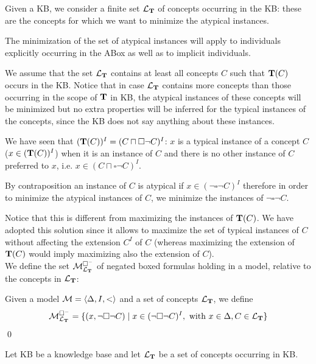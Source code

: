 \documentclass[a4paper, 11pt, oneside]{duthesis}
\newcommand{\tip}{{\bf T}}
\newcommand{\nott} {\lnot}
\newcommand{\tc} {\mid}
\newcommand{\bbox}{\square}
\newcommand{\sx} {\langle}
\newcommand{\dx} {\rangle}
\newcommand{\ellet} {\mathcal{L}_{\bf T}}
\newcommand{\emme} {\begin{mathcal}M\end{mathcal}}
\newenvironment{definition}
{\begin{defi} \rm}{\qed \end{defi}}
\newenvironment{definition}
{\begin{defi} \rm}{\qed \end{defi}}
\newtheorem{definition}{Definition}
\newcounter{posu}
\newtheorem{definition}[posu]{Definition}
\begin{document}
Given a KB, we consider a finite set $\ellet$ of concepts occurring in the KB: these are the concepts for which we want to minimize the atypical instances.

The minimization of the set of atypical instances will apply to individuals explicitly occurring in the ABox as well as to implicit individuals.

We assume that the set $\ellet$ contains at least all concepts $C$ such that $\tip(C)$ occurs in the KB.
Notice that in case $\ellet$ contains more concepts than those occurring in the scope of $\tip$ in KB, the atypical instances of these concepts will be minimized but no extra properties will be inferred for the typical instances of the concepts, since the KB does not say anything about these instances.

We have seen that $(\tip(C))^I =(C \sqcap \bbox \neg C)^I$: $x$ is a typical instance  of a concept $C$ ($x \in (\tip(C))^I$) when it is an instance of $C$  and there is no other instance of $C$ preferred to $x$, i.e. $x \in (C \sqcap \bbox \neg C)^I$.

By contraposition an instance of $C$ is atypical if $x \in (\neg \bbox \neg C)^I$ therefore in order to minimize the atypical instances of $C$, we minimize the instances of $\neg \bbox \neg C$.

Notice that this is different from maximizing the instances of $\tip(C)$.
We have adopted this solution since it allows to maximize the set of typical instances of $C$ without affecting the extension $C^I$ of $C$ (whereas maximizing the extension of $\tip(C)$  would imply maximizing also the extension of $C$).\\

We define the set $\emme^{\bbox^-}_{\ellet}$ of negated boxed formulas holding in a model, relative to the concepts in $\ellet$:

\begin{definition}
Given a model $\emme=\sx \Delta, I, <\dx$ and a set of concepts $\ellet$, we define $$\emme^{\bbox^-}_{\ellet}=\{(x, \nott \bbox \nott C) \tc x \in (\nott \bbox \nott C)^I, \ \mbox{with} \ x \in \Delta, C \in \ellet \}$$
\end{definition}

\newpage

\noindent Let KB be a knowledge base and let ${\ellet}$ be a set of concepts occurring in KB.
\end{document}
